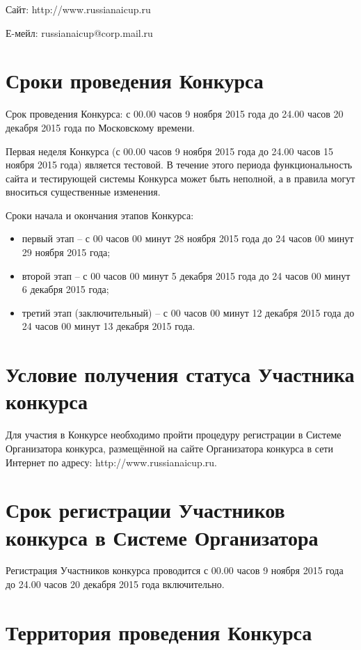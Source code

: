Сайт: http://www.russianaicup.ru

Е-мейл: russianaicup@corp.mail.ru

\section{Сроки проведения Конкурса}

Срок проведения Конкурса: с 00.00 часов 9 ноября 2015 года до 24.00 часов 20 декабря 2015 года по Московскому времени.

Первая неделя Конкурса (с 00.00 часов 9 ноября 2015 года до 24.00 часов 15 ноября 2015 года) является тестовой. В течение этого периода
функциональность сайта и тестирующей системы Конкурса может быть неполной, а в правила могут вноситься существенные изменения.

Сроки начала и окончания этапов Конкурса:
\begin{itemize}
\item первый этап – с 00 часов 00 минут 28 ноября 2015 года до 24 часов 00 минут 29 ноября 2015 года;
\item второй этап – с 00 часов 00 минут 5 декабря 2015 года до 24 часов 00 минут 6 декабря 2015 года;
\item третий этап (заключительный) – с 00 часов 00 минут 12 декабря 2015 года до 24 часов 00 минут 13 декабря 2015 года.
\end{itemize}

\section{Условие получения статуса Участника конкурса}

Для участия в Конкурсе необходимо пройти процедуру регистрации в Системе Организатора конкурса, размещённой на сайте Организатора конкурса в
сети Интернет по адресу: http://www.russianaicup.ru.

\section{Срок регистрации Участников конкурса в Системе Организатора}

Регистрация Участников конкурса проводится с 00.00 часов 9 ноября 2015 года до 24.00 часов 20 декабря 2015 года включительно.

\section{Территория проведения Конкурса}

